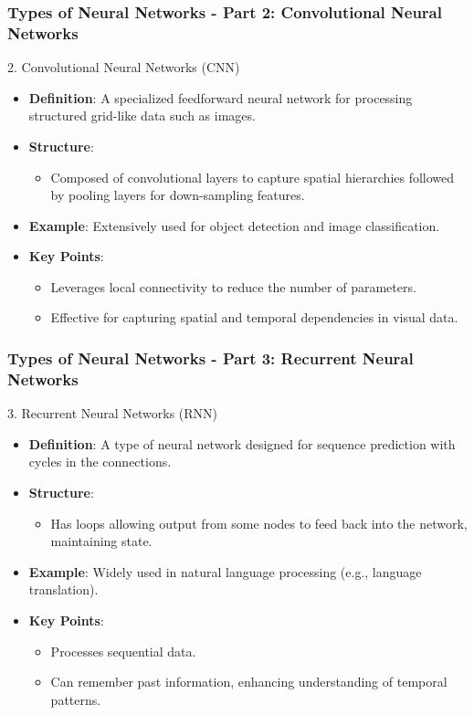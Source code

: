 \documentclass[aspectratio=169]{beamer}
\begin{document}
\begin{frame}[fragile]
    \frametitle{Types of Neural Networks - Part 2: Convolutional Neural Networks}
    \begin{block}{2. Convolutional Neural Networks (CNN)}
        \begin{itemize}
            \item \textbf{Definition}: A specialized feedforward neural network for processing structured grid-like data such as images.
            \item \textbf{Structure}: 
            \begin{itemize}
                \item Composed of convolutional layers to capture spatial hierarchies followed by pooling layers for down-sampling features.
            \end{itemize}
            \item \textbf{Example}: 
              Extensively used for object detection and image classification.
            \item \textbf{Key Points}:
              \begin{itemize}
                  \item Leverages local connectivity to reduce the number of parameters.
                  \item Effective for capturing spatial and temporal dependencies in visual data.
              \end{itemize}
        \end{itemize}
    \end{block}
\end{frame}

\begin{frame}[fragile]
    \frametitle{Types of Neural Networks - Part 3: Recurrent Neural Networks}
    \begin{block}{3. Recurrent Neural Networks (RNN)}
        \begin{itemize}
            \item \textbf{Definition}: A type of neural network designed for sequence prediction with cycles in the connections.
            \item \textbf{Structure}: 
            \begin{itemize}
                \item Has loops allowing output from some nodes to feed back into the network, maintaining state.
            \end{itemize}
            \item \textbf{Example}: 
              Widely used in natural language processing (e.g., language translation).
            \item \textbf{Key Points}:
              \begin{itemize}
                  \item Processes sequential data.
                  \item Can remember past information, enhancing understanding of temporal patterns.
              \end{itemize}
        \end{itemize}
    \end{block}
\end{frame}
\end{document}
